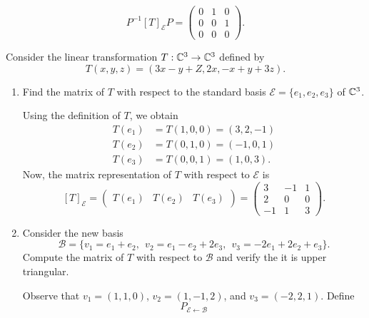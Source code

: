 \documentclass[a4paper]{article}
\begin{document}
\begin{enumerate}
\begin{solution}
            \[                P^{-1} [T]_{\mathcal{E}}^{} P   = \begin{pmatrix} 0 & 1 & 0 \\ 0 & 0 & 1 \\ 0 & 0 & 0  \end{pmatrix}. \]

        \end{solution}
\end{enumerate}

\begin{problem}
   Consider the linear transformation \( T: \mathbb{C}^{3} \to \mathbb{C}^{3}  \) defined by  
   \[  T(x,y,z) = (3x - y + Z , 2x , -x + y + 3z ). \]
\end{problem}

\begin{enumerate}
    \item Find the matrix of \( T  \) with respect to the standard basis \( \mathcal{E} = \{ {e}_{1} , {e}_{2}, {e}_{3} \}  \) of \( \mathbb{C}^{3} \).
        \begin{solution}
            Using the definition of \( T  \), we obtain
        \begin{align*}
            T({e}_{1}) &= T(1,0,0) = (3,2,-1) \\
            T({e}_{2}) &= T(0,1,0) = (-1,0,1) \\
            T({e}_{3}) &= T(0,0,1) = (1,0,3).
        \end{align*}
        Now, the matrix representation of \( T  \) with respect to \( \mathcal{E} \) is
        \[ [T]_{\mathcal{E}}^{} = \begin{pmatrix} T({e}_{1}) & T({e}_{2}) & T({e}_{3}) \end{pmatrix}  = \begin{pmatrix}  3 & - 1 &  1 \\ 2 & 0 & 0 \\ -1 & 1 & 3    \end{pmatrix}.  \]
        \end{solution}
    \item Consider the new basis 
        \[  \mathcal{B} = \{  {v}_{1} = {e}_{1} + {e}_{2} , \ \ {v}_{2} = {e}_{1} - {e}_{2} + 2 {e}_{3} , \ \ {v}_{3} = -2 {e}_{1} + 2 {e}_{2} + {e}_{3} \}.  \]
        Compute the matrix of \( T  \) with respect to \( \mathcal{B}  \) and verify the it is upper triangular.
        \begin{solution}
        Observe that \( {v}_{1} = (1,1,0) \), \( {v}_{2} = (1,-1,2) \), and \( {v}_{3} = (-2,2,1) \). Define
        \[  {P}_{\mathcal{E} \leftarrow \mathcal{B}} \]
        \end{solution}
\end{enumerate}
\end{document}

